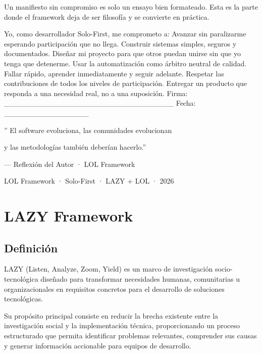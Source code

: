 \documentclass[14pt,a4paper,oneside]{extbook}
\begin{document}
Un manifiesto sin compromiso es solo un ensayo bien formateado. Esta es la parte donde el framework deja de ser filosofía y se convierte en práctica.



\begin{authorobservation}
Yo, como desarrollador Solo-First, me comprometo a: Avanzar sin paralizarme esperando participación que no llega. Construir sistemas simples, seguros y documentados. Diseñar mi proyecto para que otros puedan unirse sin que yo tenga que detenerme. Usar la automatización como árbitro neutral de calidad. Fallar rápido, aprender inmediatamente y seguir adelante. Respetar las contribuciones de todos los niveles de participación. Entregar un producto que responda a una necesidad real, no a una suposición.   Firma: \_\_\_\_\_\_\_\_\_\_\_\_\_\_\_\_\_\_\_\_\_\_\_\_\_\_\_\_\_\_\_\_     Fecha: \_\_\_\_\_\_\_\_\_\_\_\_\_\_\_\_
\end{authorobservation}





\begin{authorobservation}

 '' El software evoluciona, las comunidades evolucionan

y las metodologías también deberían hacerlo.'' 

--- Reflexión del Autor · LOL Framework

LOL Framework · Solo-First · LAZY + LOL · 2026
\end{authorobservation}


\chapter{LAZY Framework}

\section{Definición}

LAZY (Listen, Analyze, Zoom, Yield) es un marco de investigación socio-tecnológica diseñado para transformar necesidades humanas, comunitarias u organizacionales en requisitos concretos para el desarrollo de soluciones tecnológicas.

Su propósito principal consiste en reducir la brecha existente entre la investigación social y la implementación técnica, proporcionando un proceso estructurado que permita identificar problemas relevantes, comprender sus causas y generar información accionable para equipos de desarrollo.
\end{document}
